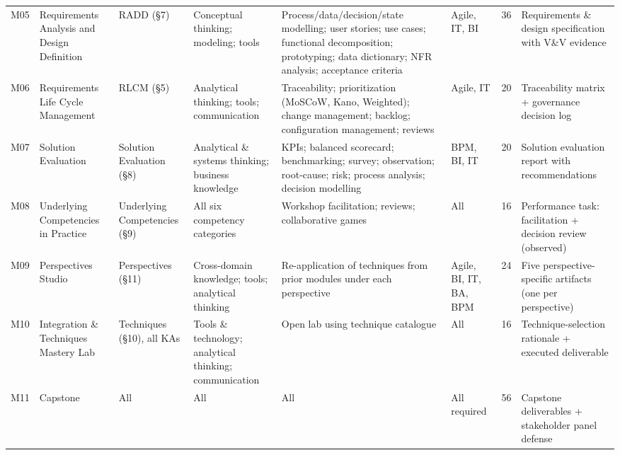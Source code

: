 \documentclass[11pt,letterpaper,oneside]{report}
\begin{document}
\begin{landscape}
\begin{longtable}{@{}R{0.65cm} R{2.85cm} R{2.50cm} R{2.30cm} R{4.20cm} R{2.30cm} R{0.85cm} R{2.65cm}@{}}
M05 & Requirements Analysis and Design Definition
    & RADD (\S7)
    & Conceptual thinking; modeling; tools
    & Process/data/decision/state modelling; user stories; use cases; functional decomposition; prototyping; data dictionary; NFR analysis; acceptance criteria
    & Agile, IT, BI
    & 36
    & Requirements \& design specification with V\&V evidence \\

M06 & Requirements Life Cycle Management
    & RLCM (\S5)
    & Analytical thinking; tools; communication
    & Traceability; prioritization (MoSCoW, Kano, Weighted); change management; backlog; configuration management; reviews
    & Agile, IT
    & 20
    & Traceability matrix + governance decision log \\

M07 & Solution Evaluation
    & Solution Evaluation (\S8)
    & Analytical \& systems thinking; business knowledge
    & KPIs; balanced scorecard; benchmarking; survey; observation; root-cause; risk; process analysis; decision modelling
    & BPM, BI, IT
    & 20
    & Solution evaluation report with recommendations \\

M08 & Underlying Competencies in Practice
    & Underlying Competencies (\S9)
    & All six competency categories
    & Workshop facilitation; reviews; collaborative games
    & All
    & 16
    & Performance task: facilitation + decision review (observed) \\

M09 & Perspectives Studio
    & Perspectives (\S11)
    & Cross-domain knowledge; tools; analytical thinking
    & Re-application of techniques from prior modules under each perspective
    & Agile, BI, IT, BA, BPM
    & 24
    & Five perspective-specific artifacts (one per perspective) \\

M10 & Integration \& Techniques Mastery Lab
    & Techniques (\S10), all KAs
    & Tools \& technology; analytical thinking; communication
    & Open lab using technique catalogue
    & All
    & 16
    & Technique-selection rationale + executed deliverable \\

M11 & Capstone
    & All
    & All
    & All
    & All required
    & 56
    & Capstone deliverables + stakeholder panel defense \\

\end{longtable}
\end{landscape}
\end{document}
